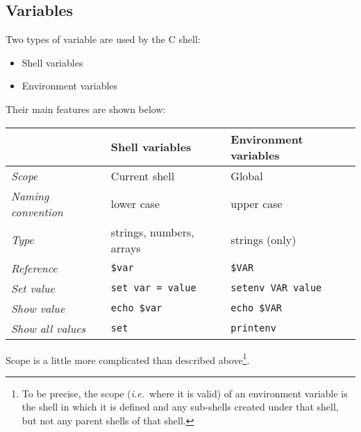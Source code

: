 \subsection{Variables}

Two types of variable are used by the C shell:
\begin{itemize}
\item Shell variables
\item Environment variables
\end{itemize}
Their main features are shown below:
\begin{center}
\begin{tabular}{|l|l|l|}
\hline
 & {\bf Shell variables} & {\bf Environment variables} \\ \hline \hline
{\em Scope} & Current shell & Global \\ \hline
{\em Naming convention} & lower case & upper case \\ \hline
{\em Type} & strings, numbers,  arrays & strings (only) \\ \hline
{\em Reference} & {\tt \$var} & {\tt \$VAR} \\ \hline
{\em Set value} & {\tt set var = value} & {\tt setenv VAR value} \\ \hline
{\em Show value} & {\tt echo \$var} & {\tt echo \$VAR} \\ \hline
{\em Show all values} & {\tt set} & {\tt printenv} \\ \hline
\end{tabular}
\end{center}
Scope is a little more complicated than described above\footnote{To be precise,
the scope ({\em i.e.}\, where it is valid) of an environment variable is the
shell in which it is defined and any sub-shells created under that shell, but
not any parent shells of that shell.}.


